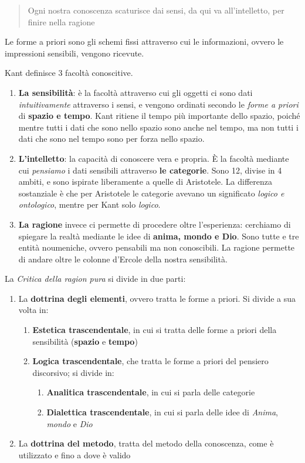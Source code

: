 \documentclass[a4paper, twoside, titlepage]{book}
\begin{document}
\begin{quotation}
Ogni nostra conoscenza scaturisce dai sensi, da qui va all’intelletto, per finire nella ragione
\end{quotation}

Le \textbf{}forme a priori\textbf{} sono gli schemi fissi attraverso cui le informazioni, ovvero le impressioni sensibili, vengono ricevute.

Kant definisce 3 facoltà conoscitive.
\begin{enumerate}
\item \textbf{La sensibilità}: è la facoltà attraverso cui gli oggetti ci sono dati \textit{intuitivamente} attraverso i sensi, e vengono ordinati secondo le \textit{forme a priori} di \textbf{spazio e tempo}. Kant ritiene il tempo più importante dello spazio, poiché mentre tutti i dati che sono nello spazio sono anche nel tempo, ma non tutti i dati che sono nel tempo sono per forza nello spazio.
\item \textbf{L’intelletto}: la capacità di conoscere vera e propria. È la facoltà mediante cui \textit{pensiamo} i dati sensibili attraverso \textbf{le categorie}. Sono 12, divise in 4 ambiti, e sono ispirate liberamente a quelle di Aristotele. La differenza sostanziale è che per Aristotele le categorie avevano un significato \textit{logico e ontologico}, mentre per Kant solo \textit{logico}.
\item \textbf{La ragione} invece ci permette di procedere oltre l’esperienza: cerchiamo di spiegare la realtà mediante le idee di \textbf{anima, mondo e Dio}. Sono tutte e tre entità noumeniche, ovvero pensabili ma non conoscibili. La ragione permette di andare oltre le colonne d’Ercole della nostra sensibilità.
\end{enumerate}

La \textit{Critica della ragion pura} si divide in due parti:
\begin{enumerate}
\item La \textbf{dottrina degli elementi}, ovvero tratta le forme a priori. Si divide a sua volta in:
 \begin{enumerate}
  \item \textbf{Estetica trascendentale}, in cui si tratta delle forme a priori della sensibilità (\textbf{spazio} e \textbf{tempo})
  \item \textbf{Logica trascendentale}, che tratta le forme a priori del pensiero discorsivo; si divide in:
   \begin{enumerate}
    \item \textbf{Analitica trascendentale}, in cui si parla delle categorie
    \item \textbf{Dialettica trascendentale}, in cui si parla delle idee di \textit{Anima}, \textit{mondo} e \textit{Dio}
   \end{enumerate}
   \end{enumerate}
\item La \textbf{dottrina del metodo}, tratta del metodo della conoscenza, come è utilizzato e fino a dove è valido
\end{enumerate}
\end{document}
